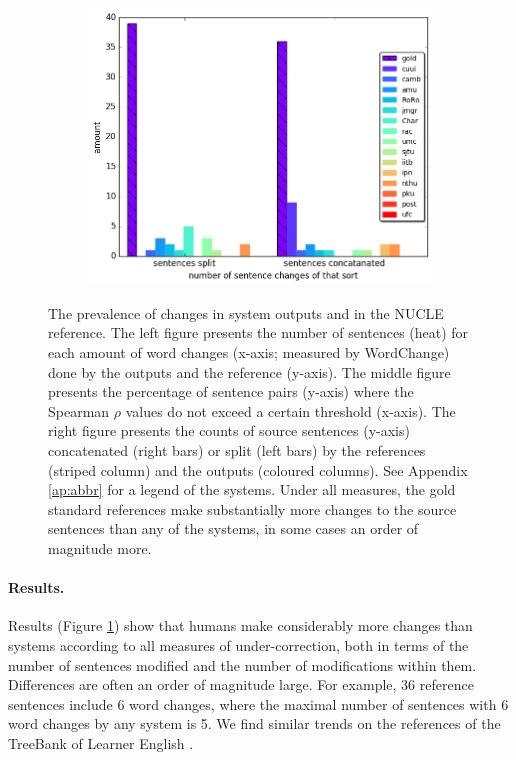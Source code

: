 \documentclass[a4paper]{article}
\begin{document}
\begin{figure}
\begin{subfigure}[]{0.6\columnwidth}
		\includegraphics[width = \textwidth]{aligned}
	\end{subfigure}
	\caption{\label{fig:over-conservatism}
		The prevalence of changes in system outputs and in the NUCLE reference.
		The left figure presents the number of sentences (heat) for each amount of word changes
		(x-axis; measured by {\sc WordChange}) done by the outputs and the reference (y-axis).
		The middle figure presents the percentage of sentence pairs (y-axis) where the
		Spearman $\rho$ values do not exceed a certain threshold (x-axis).
		The right figure presents the counts of source sentences (y-axis) concatenated (right bars) or split (left bars) by the references (striped column) and the outputs (coloured columns).
		See Appendix \ref{ap:abbr} for a legend of the systems.
		Under all measures, the gold standard references make substantially more changes to the source sentences than any of the systems, in some cases an order of magnitude more.
	}
\end{figure}

\paragraph{Results.} \hspace{-.5cm}
Results (Figure \ref{fig:over-conservatism}) show that humans make considerably more changes than systems according to all measures of under-correction, 
both in terms of the number of sentences modified and the number of modifications within them. Differences are often an order of magnitude large.
For example, 36 reference sentences include 6 word changes, where the maximal number of sentences with 6 word changes by any system is 5.
We find similar trends on the references of the TreeBank of Learner English \cite{yannakoudakis2011new}.
\end{document}
